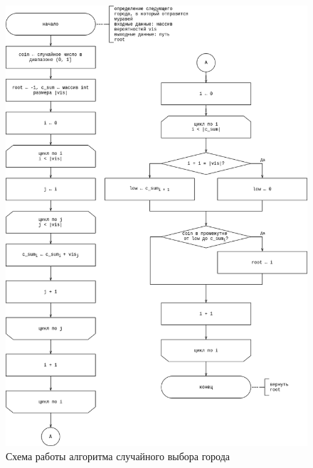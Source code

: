 \begin{center}
    \begin{figure}[!h]
        \centering
        \includegraphics[width=0.85\linewidth]{img/tsp-ant-wheel.drawio.png}
        \caption{Схема работы алгоритма случайного выбора города}
        \label{fig:ant-wheel}
    \end{figure}
\end{center}
\newpage


